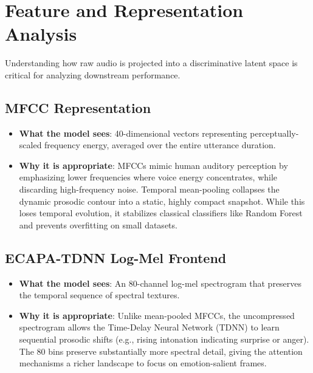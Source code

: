 \documentclass[12pt,a4paper]{report}
\begin{document}
\section{Feature and Representation Analysis}
Understanding how raw audio is projected into a discriminative latent space is critical for analyzing downstream performance.

\subsection{MFCC Representation}
\begin{itemize}
    \item \textbf{What the model sees}: 40-dimensional vectors representing perceptually-scaled frequency energy, averaged over the entire utterance duration.
    \item \textbf{Why it is appropriate}: MFCCs mimic human auditory perception by emphasizing lower frequencies where voice energy concentrates, while discarding high-frequency noise. Temporal mean-pooling collapses the dynamic prosodic contour into a static, highly compact snapshot. While this loses temporal evolution, it stabilizes classical classifiers like Random Forest and prevents overfitting on small datasets.
\end{itemize}

\subsection{ECAPA-TDNN Log-Mel Frontend}
\begin{itemize}
    \item \textbf{What the model sees}: An 80-channel log-mel spectrogram that preserves the temporal sequence of spectral textures.
    \item \textbf{Why it is appropriate}: Unlike mean-pooled MFCCs, the uncompressed spectrogram allows the Time-Delay Neural Network (TDNN) to learn sequential prosodic shifts (e.g., rising intonation indicating surprise or anger). The 80 bins preserve substantially more spectral detail, giving the attention mechanisms a richer landscape to focus on emotion-salient frames.
\end{itemize}
\end{document}
